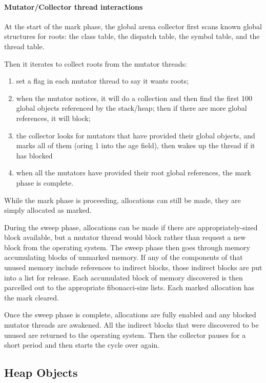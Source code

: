 \documentclass[
]{ceurart}
\begin{document}
\paragraph{Mutator/Collector thread interactions}
At the start of the mark phase, the global arena collector first scans known global structures for roots: the class table, the dispatch table, the symbol table, and the thread table.

Then it iterates to collect roots from the mutator threads:
\begin{enumerate}
\item set a flag in each mutator thread to say it wants roots;
\item when the mutator notices, it will do a collection and then find the first 100 global objects referenced by the stack/heap; then if there are more global references, it will block;
\item the collector looks for mutators that have provided their global objects, and marks all of them (oring 1 into the age field), then wakes up the thread if it has blocked
\item when all the mutators have provided their root global references, the mark phase is complete.
\end{enumerate}

While the mark phase is proceeding, allocations can still be made, they are simply allocated as marked.

During the sweep phase, allocations can be made if there are appropriately-sized block available, but a mutator thread would block rather than request a new block from the operating system.
The sweep phase then goes through memory accumulating blocks of unmarked memory.
If any of the components of that unused memory include references to indirect blocks, those indirect blocks are put into a list for release.
Each accumulated block of memory discovered is then parcelled out to the appropriate fibonacci-size lists.
Each marked allocation has the mark cleared.

Once the sweep phase is complete, allocations are fully enabled and any blocked mutator threads are awakened.
All the indirect blocks that were discovered to be unused are returned to the operating system.
Then the collector pauses for a short period and then starts the cycle over again.

\subsection{Heap Objects}\label{heap-objects}
\end{document}
